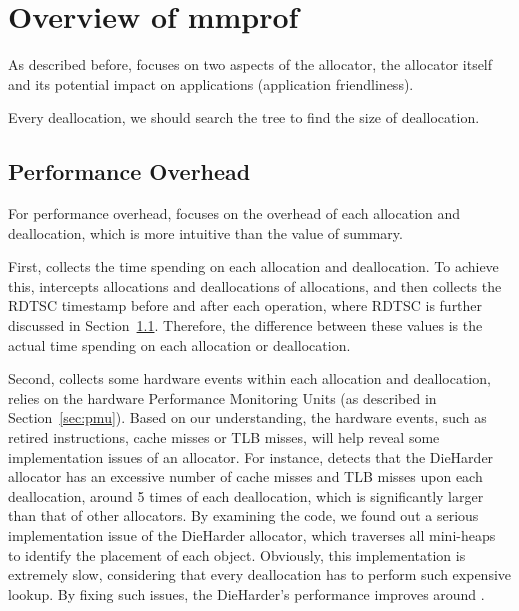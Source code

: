 \section{Overview of mmprof}

As described before, \MP{} focuses on two aspects of the allocator, the allocator itself and its potential impact on applications (application friendliness). 

Every deallocation, we should search the tree to find the size of deallocation. 

\subsection{Performance Overhead}

For performance overhead, \MP{} focuses on the overhead of each allocation and deallocation, which is more intuitive than the value of summary. 

First, \MP{} collects the time spending on each allocation and deallocation. To achieve this, \MP{} intercepts allocations and deallocations of allocations, and then collects the RDTSC timestamp before and after each operation, where RDTSC is further discussed in Section~\ref{}. Therefore, the difference between these values is the actual time spending on each allocation or deallocation.


% 

Second, \MP{} collects some hardware events within each allocation and deallocation, relies on the hardware Performance Monitoring Units (as described in Section~\ref{sec:pmu}). Based on our understanding, the hardware events, such as retired instructions, cache misses or TLB misses, will help reveal some implementation issues of an allocator. For instance, \MP{} detects that the DieHarder allocator has an excessive number of cache misses and TLB misses upon each deallocation, around 5 times of each deallocation, which is significantly larger than that of other allocators. By examining the code, we found out a serious implementation issue of the DieHarder allocator, which traverses all mini-heaps to identify the placement of each object. Obviously, this implementation is extremely slow, considering that every deallocation has to perform such expensive lookup. By fixing such issues, the DieHarder's performance improves around .     

